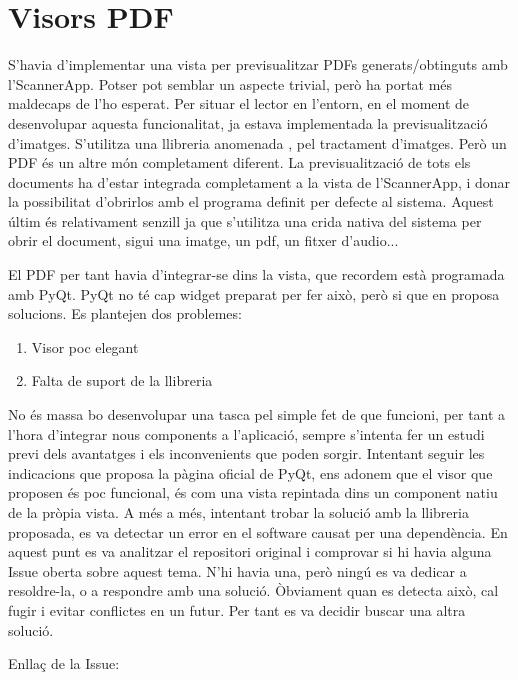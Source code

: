 \documentclass[letterpaper,11pt,catalan]{sphinxmanual}
\begin{document}
\section{Visors PDF}
\label{\detokenize{index:visors-pdf}}
S'havia d'implementar una vista per previsualitzar PDFs generats/obtinguts amb l'ScannerApp.
Potser pot semblar un aspecte trivial, però ha portat més maldecaps de l'ho esperat. Per
situar el lector en l'entorn, en el moment de desenvolupar aquesta funcionalitat, ja
estava implementada la previsualització d'imatges. S'utilitza una llibreria anomenada ,
pel tractament d'imatges. Però un PDF és un altre món completament diferent. La previsualització
de tots els documents ha d'estar integrada completament a la vista de l'ScannerApp, i donar la
possibilitat d'obrirlos amb el programa definit per defecte al sistema. Aquest últim és
relativament senzill ja que s'utilitza una crida nativa del sistema per obrir el document, sigui
una imatge, un pdf, un fitxer d'audio...

El PDF per tant havia d'integrar-se dins la vista, que recordem està programada amb PyQt.
PyQt no té cap widget preparat per fer això, però si que en proposa solucions. Es plantejen dos
problemes:
\begin{enumerate}
\item {} 
Visor poc elegant

\item {} 
Falta de suport de la llibreria

\end{enumerate}

No és massa bo desenvolupar una tasca pel simple fet de que funcioni, per tant a l'hora
d'integrar nous components a l'aplicació, sempre s'intenta fer un estudi previ dels avantatges
i els inconvenients que poden sorgir. Intentant seguir les indicacions que proposa la pàgina oficial de PyQt,
ens adonem que el visor que proposen és poc funcional, és com una vista repintada dins un component natiu
de la pròpia vista. A més a més, intentant trobar la solució amb la llibreria proposada, es va detectar
un error en el software causat per una dependència. En aquest punt es va analitzar el repositori original
i comprovar si hi havia alguna Issue oberta sobre aquest tema. N'hi havia una, però ningú es va dedicar
a resoldre-la, o a respondre amb una solució. Òbviament quan es detecta això, cal fugir i evitar conflictes
en un futur. Per tant es va decidir buscar una altra solució.

Enllaç de la Issue: 
\end{document}
